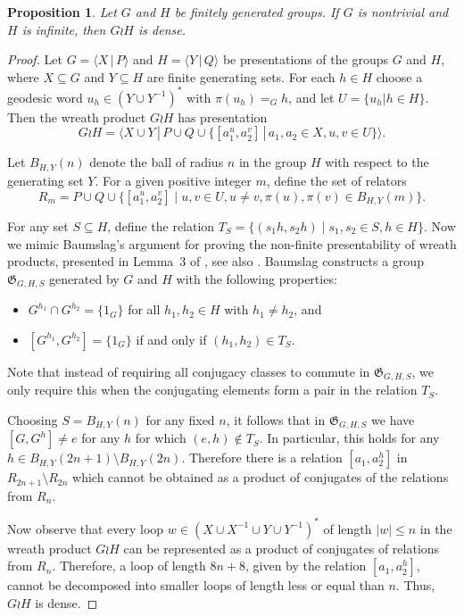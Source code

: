 \documentclass[11pt]{amsart}
\newcommand\BaumGroup{{\mathfrak G}_{G,H,S}}
\newtheorem{proposition}[theorem]{Proposition}
\theoremstyle{definition}
\begin{document}
\begin{proposition}\label{prop:BaumslagDense}
  Let $G$ and $H$ be finitely generated groups.	  If $G$ is nontrivial and $H$ is infinite, then
     $G \wr H$ is dense.
\end{proposition}
\begin{proof}
Let $G = \langle X \, |\,  P \rangle$ and
$H = \langle Y \, | \, Q \rangle$ be presentations of
the groups $G$ and $H$, where
$X \subseteq G$ and $Y \subseteq H$ are finite generating sets.
For each $h \in H$ choose a geodesic word $u_h \in (Y \cup Y^{-1})^*$ with $\pi(u_h) =_G h$, and let
$U = \{ u_h | h \in H\}$.
Then the wreath product $G \wr  H$ has presentation
\[G \wr  H = \langle  X \cup Y \, | \,
P \cup Q \cup \{[a_1^u,a_2^v]\,|\,
a_1,a_2 \in X, u,v \in U\} \rangle.\]


Let $B_{H,Y} (n)$ denote the ball
of radius $n$ in the group $H$ with respect to the
generating set $Y$.
For a given positive integer $m$, define the set of relators
\[ R_m =P \cup Q \cup  \{[a_1^u,a_2^v]
\mid u,v \in U,u\not=v,\pi(u),\pi(v) \in B_{H,Y}(m)\}.\]


For any set $S \subseteq H$, define the relation
$T_S = \{ (s_1 h,s_2 h) \mid s_1,s_2
\in S, h \in H\}$.
Now we mimic Baumslag's argument for
proving the non-finite presentability of
wreath products, presented in Lemma~3 of  \cite{baumslag61}, see also  \cite{berstein2015}.
Baumslag constructs a group $\BaumGroup$
generated by $G$ and $H$ with the following properties:
\begin{itemize}[itemsep=5pt]
    \item $G^{h_1}  \cap G^{h_2} =\{1_G\} $ for all $h_1,h_2 \in H$ with $h_1 \not= h_2$, and
    \item $\left[ G^{h_1}, G^{h_2}\right]= \{1_G\}$ if and only if $(h_1,h_2) \in T_S$.

\end{itemize}
Note that instead of requiring all conjugacy classes to commute in $\BaumGroup$, we only require this when the conjugating elements form a pair in the relation $T_S$.


Choosing $S = B_{H,Y}(n)$ for any fixed $n$, it follows that in $\BaumGroup $ we have $[G,G^h]\not=e$ for any $h$ for which
$(e,h) \not\in T_S$.
In particular, this holds for any
$h \in B_{H,Y} (2n+1) \setminus B_{H,Y} (2n)$.
Therefore there is a relation $[a_1,a_2 ^h]$ in
$R_{2n+1} \setminus R_{2n} $ which cannot be obtained
as a product of conjugates of the relations from
$R_n$.

Now observe that every loop $w \in (X \cup X^{-1} \cup Y \cup Y^{-1})^*$
of length $|w| \leqslant n$
in the wreath product $G \wr H$
can be represented as a product of
conjugates of relations from $R_n$.
Therefore, a loop of length $8n + 8$,
given by the relation $[a_1,a_2 ^h]$,
cannot be decomposed into
smaller loops of length less or equal than $n$.
Thus, $G \wr H$ is dense.
\end{proof}
\end{document}
